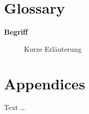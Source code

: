 {}
\chapter*{Glossary}
\begin{comment}
Unterschiedliche Disziplinen verwenden z. T. die selben Begriffe für unterschiedliche Sachverhalte und unterschiedliche Begriffe für die selben Sachverhalte. Hier können Sie wiederkehrende zentrale Begriffe der Arbeit kurz definieren (z. B. Adipositas, Depression, Legasthenie, etc.). Früher wichtiger, dann konnte man hierhin blättern und musste nicht den ganzen Text absuchen. Heute verwendet man digital die Suchfunktion. Trotzdem ernst nehmen.
\end{comment}

\begin{description}
    \item [\textbf{Begriff}] Kurze Erläuterung
\end{description}
\clearpage

{}
\chapter*{Appendices}
\begin{comment}
Zusätzliche Informationen die zu lang für die Arbeit sind können hier verfügbar gemacht werden.

Aber auch an die DVD denken — was ist dort besser aufgehoben? Die Zeiten, in denen man Programmcode manuell eingetippt hat, sind ja glücklicherweise lange vorbei, deswegen macht Code hier wenig Sinn.

Ist entsprechend ein Priorisierung: Was würde sich der Leser vielleicht gerne während des Lesens der Arbeit (z. B. im Zug) ansehen, wenn er auch gerade nicht auf die DVD zugreifen kann (kein DVD Laufwerk)?

Inhalte sind oft: Überblick der Inhalte der DVD, Fragebögen (falls digital Screenshots oder neu für den Druck formatiert), Interviewleitfäden, etc. Selten detailliertere Evaluationsergebnisse.

Hier kurz die Zwischenüberschriften nennen und evtl. 1 Satz, was dort zu finden ist (falls es nicht schon durch die Zwischenüberschrift klar ist). 
\end{comment}

Text \dots

{}
